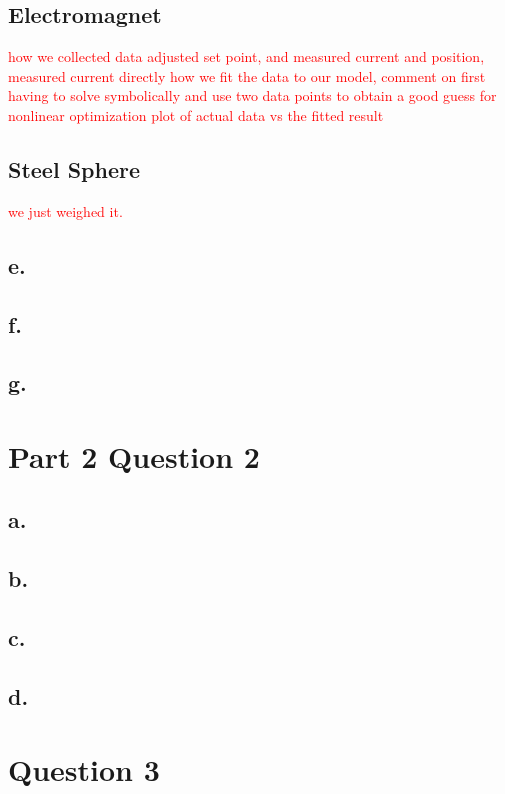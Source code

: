 \documentclass{article}
\newcommand{\xxx}[1]{\textcolor{red}{#1}}
\theoremstyle{plain}
\theoremstyle{definition}
\theoremstyle{remark}
\begin{document}
\subsection{Electromagnet}
\xxx{how we collected data adjusted set point, and measured current and position, measured current directly}
\xxx{how we fit the data to our model, comment on first having to solve symbolically and use two data points to obtain a good guess for nonlinear optimization}
\xxx{plot of actual data vs the fitted result}

\subsection{Steel Sphere}
\xxx{we just weighed it.}

\subsection*{e.}

\subsection*{f.}

\subsection*{g.}

\section{Part 2 Question 2}

\subsection*{a.}

\subsection*{b.}

\subsection*{c.}

\subsection*{d.}

\section*{Question 3}
\end{document}
